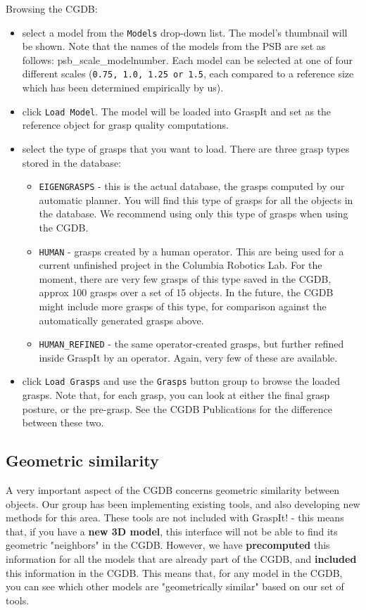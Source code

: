 Browsing the CGDB:
\begin{itemize}
\item select a model from the \texttt{Models} drop-down list. The
  model's thumbnail will be shown. Note that the names of the models
  from the PSB are set as follows: psb\_scale\_modelnumber. Each model
  can be selected at one of four different scales (\texttt{0.75, 1.0,
    1.25 or 1.5}, each compared to a reference size which has been
  determined empirically by us).
\item click \texttt{Load Model}. The model will be loaded into GraspIt
  and set as the reference object for grasp quality computations.
\item select the type of grasps that you want to load. There are three
  grasp types stored in the database:
\begin{itemize}
  \item \texttt{EIGENGRASPS} - this is the actual database, the grasps
    computed by our automatic planner. You will find this type of
    grasps for all the objects in the database. We recommend using
    only this type of grasps when using the CGDB.
  \item \texttt{HUMAN} - grasps created by a human operator. This are
    being used for a current unfinished project in the Columbia
    Robotics Lab. For the moment, there are very few grasps of this
    type saved in the CGDB, approx 100 grasps over a set of 15
    objects. In the future, the CGDB might include more grasps of this
    type, for comparison against the automatically generated grasps
    above.
  \item \texttt{HUMAN\_REFINED} - the same operator-created grasps,
    but further refined inside GraspIt by an operator. Again, very few
    of these are available.
\end{itemize}
\item click \texttt{Load Grasps} and use the \texttt{Grasps} button
  group to browse the loaded grasps. Note that, for each grasp, you
  can look at either the final grasp posture, or the pre-grasp. See
  the CGDB Publications for the difference between these two.
\end{itemize}

\subsection{Geometric similarity}

A very important aspect of the CGDB concerns geometric similarity
between objects. Our group has been implementing existing tools, and
also developing new methods for this area. These tools are not
included with GraspIt! - this means that, if you have a \textbf{new 3D
  model}, this interface will not be able to find its geometric
"neighbors" in the CGDB. However, we have \textbf{precomputed} this
information for all the models that are already part of the CGDB, and
\textbf{included} this information in the CGDB. This means that, for
any model in the CGDB, you can see which other models are
"geometrically similar" based on our set of tools.

